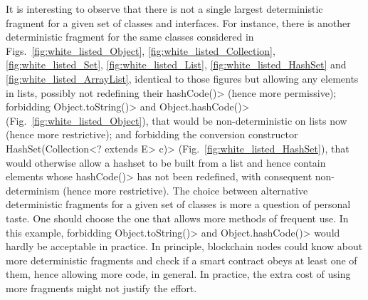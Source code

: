 It is interesting to observe that there is not a single largest deterministic fragment
for a given set of classes and interfaces. For instance, 
there is another deterministic fragment for the same classes considered in
Figs.~\ref{fig:white_listed_Object}, \ref{fig:white_listed_Collection},
\ref{fig:white_listed_Set}, \ref{fig:white_listed_List},
\ref{fig:white_listed_HashSet} and \ref{fig:white_listed_ArrayList}, identical
to those figures but allowing any elements in lists, possibly not redefining
their \<hashCode()> (hence more permissive);
forbidding \<Object.toString()> and \<Object.hashCode()> (Fig.~\ref{fig:white_listed_Object}),
that would be non-deterministic on lists now (hence
more restrictive); and forbidding the conversion constructor
\<HashSet(Collection$\text{<}$? extends E$\text{>}$ c)>
(Fig.~\ref{fig:white_listed_HashSet}), that would otherwise allow a hashset to be
built from a list and hence contain elements whose \<hashCode()> has not been redefined,
with consequent non-determinism (hence more restrictive). The choice between alternative
deterministic fragments for a given set of classes is more a question of personal taste.
One should choose the one that allows more methods of frequent use. In this example,
forbidding \<Object.toString()> and \<Object.hashCode()> would hardly be acceptable in practice.
In principle, blockchain nodes could know about more deterministic fragments and check
if a smart contract obeys at least one of them, hence allowing more code, in general.
In practice, the extra cost of using more fragments might not justify the effort.
